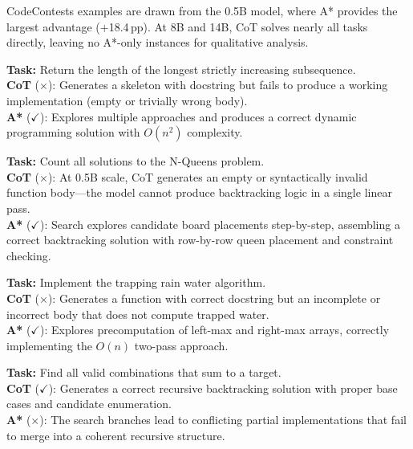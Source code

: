 \documentclass[10pt]{article}
\begin{document}
{CodeContests examples are drawn from the 0.5B model, where A* provides the largest advantage (+18.4\,pp). At 8B and 14B, CoT solves nearly all tasks directly, leaving no A*-only instances for qualitative analysis.

\begin{examplebox}[title=CC/0 --- A* Correct{,} CoT Wrong (0.5B)]
\textbf{Task:} Return the length of the longest strictly increasing subsequence.\\[4pt]
\textbf{CoT} ($\times$): Generates a skeleton with docstring but fails to produce a working implementation (empty or trivially wrong body).\\[4pt]
\textbf{A*} ($\checkmark$): Explores multiple approaches and produces a correct dynamic programming solution with $O(n^2)$ complexity.
\end{examplebox}

\begin{examplebox}[title=CC/4 --- A* Correct{,} CoT Wrong (0.5B)]
\textbf{Task:} Count all solutions to the N-Queens problem.\\[4pt]
\textbf{CoT} ($\times$): At 0.5B scale, CoT generates an empty or syntactically invalid function body---the model cannot produce backtracking logic in a single linear pass.\\[4pt]
\textbf{A*} ($\checkmark$): Search explores candidate board placements step-by-step, assembling a correct backtracking solution with row-by-row queen placement and constraint checking.
\end{examplebox}

\begin{examplebox}[title=CC/6 --- A* Correct{,} CoT Wrong (0.5B)]
\textbf{Task:} Implement the trapping rain water algorithm.\\[4pt]
\textbf{CoT} ($\times$): Generates a function with correct docstring but an incomplete or incorrect body that does not compute trapped water.\\[4pt]
\textbf{A*} ($\checkmark$): Explores precomputation of left-max and right-max arrays, correctly implementing the $O(n)$ two-pass approach.
\end{examplebox}

\begin{examplebox}[title=CC/7 --- CoT Correct{,} A* Wrong (0.5B)]
\textbf{Task:} Find all valid combinations that sum to a target.\\[4pt]
\textbf{CoT} ($\checkmark$): Generates a correct recursive backtracking solution with proper base cases and candidate enumeration.\\[4pt]
\textbf{A*} ($\times$): The search branches lead to conflicting partial implementations that fail to merge into a coherent recursive structure.
\end{examplebox}

}
\end{document}
